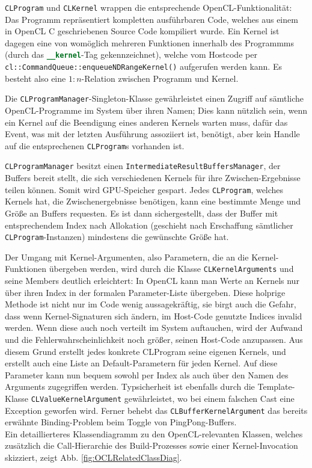 	\lstinline|CLProgram| und \lstinline|CLKernel| wrappen die entsprechende OpenCL-Funktionalität:
	Das Programm repräsentiert kompletten ausführbaren Code, welches aus einem in OpenCL C geschriebenen
	Source Code kompiliert wurde. Ein Kernel ist dagegen eine von womöglich mehreren Funktionen innerhalb
	des Programmms (durch das \lstinline[language=OpenCL]|__kernel|-Tag gekennzeichnet),
	welche vom Hostcode per \lstinline|cl::CommandQueue::enqueueNDRangeKernel()| aufgerufen werden kann.
	Es besteht also eine $1:n$-Relation zwischen Programm und Kernel.
	
	Die \lstinline|CLProgramManager|-Singleton-Klasse gewährleistet einen Zugriff auf sämtliche OpenCL-Programme
	im System über ihren Namen; Dies kann nützlich sein, wenn ein Kernel auf die Beendigung eines anderen Kernels
	warten muss, dafür das Event, was mit der letzten Ausführung assoziiert ist, benötigt, aber kein Handle auf die 
	entsprechenen \lstinline|CLProgram|s vorhanden ist.
	
	\lstinline|CLProgramManager| besitzt einen \lstinline|IntermediateResultBuffersManager|, der Buffers bereit stellt,
	die sich verschiedenen Kernels für ihre Zwischen-Ergebnisse teilen können. Somit wird GPU-Speicher gespart.
	Jedes \lstinline|CLProgram|, welches Kernels hat, die Zwischenergebnisse benötigen, kann eine bestimmte Menge
	und Größe an Buffers requesten. Es ist dann sichergestellt, dass der Buffer mit entsprechendem Index nach 
	Allokation (geschieht nach Erschaffung sämtlicher \lstinline|CLProgram|-Instanzen) mindestens die
	gewünschte Größe hat.
	 
	
		
		\label{sec:CLKernelArguments}
		Der Umgang mit Kernel-Argumenten, also Parametern, die an die Kernel-Funktionen übergeben werden, 
		wird durch die Klasse \lstinline|CLKernelArguments| und seine Members deutlich erleichtert:
		In OpenCL kann man Werte an Kernels nur über ihren Index in der formalen Parameter-Liste übergeben.
		Diese holprige Methode ist nicht nur im Code wenig aussagekräftig, sie birgt auch die Gefahr,
		dass wenn Kernel-Signaturen sich ändern, im Host-Code genutzte Indices invalid werden.
		Wenn diese auch noch verteilt im System auftauchen, wird der Aufwand und die Fehlerwahrscheinlichkeit noch größer,
		seinen Host-Code anzupassen. Aus diesem Grund erstellt jedes konkrete CLProgram seine eigenen Kernels,
		und erstellt auch eine Liste an Default-Parametern für jeden Kernel. Auf diese Parameter kann nun bequem
		sowohl per Index als auch über den Namen des Arguments zugegriffen werden. Typsicherheit ist ebenfalls
		durch die Template-Klasse \lstinline|CLValueKernelArgument| gewährleistet, wo bei einem falschen
		Cast eine Exception geworfen wird.
		Ferner behebt das \lstinline|CLBufferKernelArgument| das bereits erwähnte Binding-Problem 
		beim Toggle von PingPong-Buffers.\\
		Ein detaillierteres Klassendiagramm zu den OpenCL-relevanten Klassen,
		welches zusätzlich die Call-Hierarchie des Build-Prozesses sowie einer Kernel-Invocation skizziert,
		zeigt Abb. \ref{fig:OCLRelatedClassDiag}.
		
